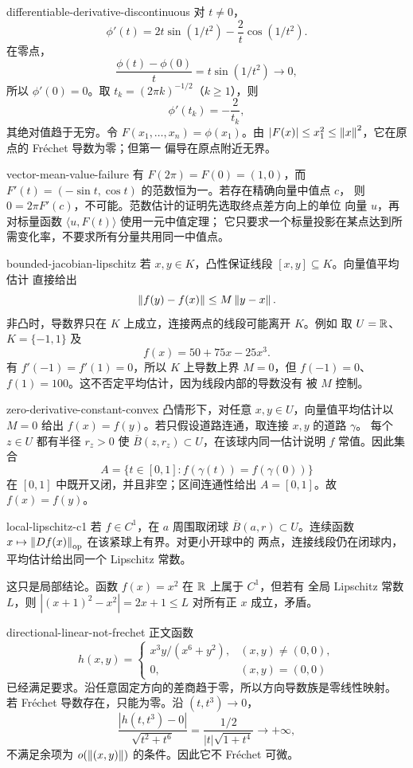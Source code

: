 \begin{solution}{differentiable-derivative-discontinuous}
对 \(t\ne0\)，
\[
 \phi'(t)=2t\sin(1/t^2)-\frac2t\cos(1/t^2).
\]
在零点，
\[
 \frac{\phi(t)-\phi(0)}t=t\sin(1/t^2)\to0,
\]
所以 $\phi'(0)=0$。取 $t_k=(2\pi k)^{-1/2}$（$k\ge1$），则
\[
 \phi'(t_k)=-\frac2{t_k},
\]
其绝对值趋于无穷。令 $F(x_1,\ldots,x_n)=\phi(x_1)$。由
$|F(x)|\le x_1^2\le\left\lVert x\right\rVert^2$，它在原点的 Fréchet 导数为零；但第一
偏导在原点附近无界。
\end{solution}

\begin{solution}{vector-mean-value-failure}
有 \(F(2\pi)=F(0)=(1,0)\)，而
\(F'(t)=(-\sin t,\cos t)\) 的范数恒为一。若存在精确向量中值点 \(c\)，
则 \(0=2\pi F'(c)\)，不可能。范数估计的证明先选取终点差方向上的单位
向量 \(u\)，再对标量函数 \(\langle u,F(t)\rangle\) 使用一元中值定理；
它只要求一个标量投影在某点达到所需变化率，不要求所有分量共用同一中值点。
\end{solution}

\begin{solution}{bounded-jacobian-lipschitz}
若 \(x,y\in K\)，凸性保证线段 \([x,y]\subseteq K\)。向量值平均估计
直接给出
\[
 \left\lVert f(y)-f(x)\right\rVert\le M\left\lVert y-x\right\rVert.
\]
非凸时，导数界只在 \(K\) 上成立，连接两点的线段可能离开 \(K\)。例如
取 \(U=\mathbb{R}\)、\(K=\{-1,1\}\) 及
\[
 f(x)=50+75x-25x^3.
\]
有 \(f'(-1)=f'(1)=0\)，所以 \(K\) 上导数上界 \(M=0\)，但
\(f(-1)=0\)、\(f(1)=100\)。这不否定平均估计，因为线段内部的导数没有
被 \(M\) 控制。
\end{solution}

\begin{solution}{zero-derivative-constant-convex}
凸情形下，对任意 \(x,y\in U\)，向量值平均估计以 \(M=0\) 给出
\(f(x)=f(y)\)。若只假设道路连通，取连接 \(x,y\) 的道路 \(\gamma\)。
每个 \(z\in U\) 都有半径 \(r_z>0\) 使
\(\overline B(z,r_z)\subset U\)，在该球内同一估计说明 \(f\)
常值。因此集合
\[
 A=\{t\in[0,1]:f(\gamma(t))=f(\gamma(0))\}
\]
在 \([0,1]\) 中既开又闭，并且非空；区间连通性给出 \(A=[0,1]\)。故
\(f(x)=f(y)\)。
\end{solution}

\begin{solution}{local-lipschitz-c1}
若 \(f\in C^1\)，在 \(a\) 周围取闭球
\(\overline B(a,r)\subset U\)。连续函数
\(x\mapsto\left\lVert Df(x)\right\rVert_{\mathrm{op}}\) 在该紧球上有界。对更小开球中的
两点，连接线段仍在闭球内，平均估计给出同一个 Lipschitz 常数。

这只是局部结论。函数 \(f(x)=x^2\) 在 \(\mathbb{R}\) 上属于 \(C^1\)，但若有
全局 Lipschitz 常数 \(L\)，则
\(|(x+1)^2-x^2|=2x+1\le L\) 对所有正 \(x\) 成立，矛盾。
\end{solution}

\begin{solution}{directional-linear-not-frechet}
正文函数
\[
 h(x,y)=
 \begin{cases}x^3y/(x^6+y^2),&(x,y)\ne(0,0),\\0,&(x,y)=(0,0)
 \end{cases}
\]
已经满足要求。沿任意固定方向的差商趋于零，所以方向导数族是零线性映射。
若 Fréchet 导数存在，只能为零。沿 \((t,t^3)\to0\)，
\[
 \frac{|h(t,t^3)-0|}{\sqrt{t^2+t^6}}
 =\frac{1/2}{|t|\sqrt{1+t^4}}\longrightarrow+\infty,
\]
不满足余项为 \(o(\left\lVert(x,y)\right\rVert)\) 的条件。因此它不 Fréchet 可微。
\end{solution}
